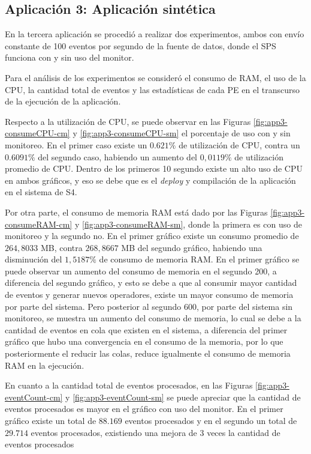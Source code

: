 \subsection{Aplicación 3: Aplicación sintética}
En la tercera aplicación se procedió a realizar dos experimentos, ambos con envío constante de 100 eventos por segundo de la fuente de datos, donde el SPS funciona con y sin uso del monitor.

Para el análisis de los experimentos se consideró el consumo de RAM, el uso de la CPU, la cantidad total de eventos y las estadísticas de cada PE en el transcurso de la ejecución de la aplicación.

Respecto a la utilización de CPU, se puede observar en las Figuras \ref{fig:app3-consumeCPU-cm} y \ref{fig:app3-consumeCPU-sm} el porcentaje de uso con y sin monitoreo. En el primer caso existe un $0.621\%$ de utilización de CPU, contra un $0.6091\%$ del segundo caso, habiendo un aumento del $0,0119\%$ de utilización promedio de CPU. Dentro de los primeros 10 segundo existe un alto uso de CPU en ambos gráficos, y eso se debe que es el \textit{deploy} y compilación de la aplicación en el sistema de S4.

Por otra parte, el consumo de memoria RAM está dado por las Figuras \ref{fig:app3-consumeRAM-cm} y \ref{fig:app3-consumeRAM-sm}, donde la primera es con uso de monitoreo y la segundo no. En el primer gráfico existe un consumo promedio de $264,8033$ MB, contra $268,8667$ MB del segundo gráfico, habiendo una disminución del $1,5187\%$ de consumo de memoria RAM. En el primer gráfico se puede observar un aumento del consumo de memoria en el segundo 200, a diferencia del segundo gráfico, y esto se debe a que al consumir mayor cantidad de eventos y generar nuevos operadores, existe un mayor consumo de memoria por parte del sistema. Pero posterior al segundo 600, por parte del sistema sin monitoreo, se muestra un aumento del consumo de memoria, lo cual se debe a la cantidad de eventos en cola que existen en el sistema, a diferencia del primer gráfico que hubo una convergencia en el consumo de la memoria, por lo que posteriormente el reducir las colas, reduce igualmente el consumo de memoria RAM en la ejecución.

En cuanto a la cantidad total de eventos procesados, en las Figuras \ref{fig:app3-eventCount-cm} y \ref{fig:app3-eventCount-sm} se puede apreciar que la cantidad de eventos procesados es mayor en el gráfico con uso del monitor. En el primer gráfico existe un total de $88.169$ eventos procesados y en el segundo un total de $29.714$ eventos procesados, existiendo una mejora de 3 veces la cantidad de eventos procesados

